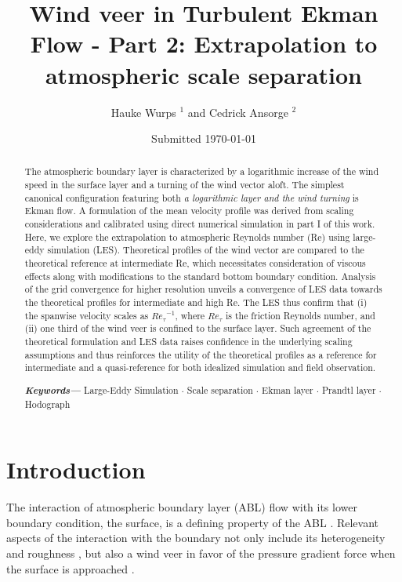 \documentclass[smallcondensed,draft]{svjour3}
\author{Hauke Wurps $^{1}$ and Cedrick Ansorge $^{2}$}
\institute{$^{1}$ Uni Oldenburg \newline 
$^{2}$ FU Berlin, Institut f\"ur Meteorologie, Carl-Heinrich-Becker-Weg 6--10, 12165 Berlin \email{cedrick@posteo.de}}
\date{Submitted \today}
\title{Wind veer in Turbulent Ekman Flow - Part 2: Extrapolation to atmospheric scale separation}
\providecommand{\keywords}[1]
{
  \small	
  \textbf{\textit{Keywords---}} #1
}
\begin{document}
 

\maketitle

\begin{abstract}
  The atmospheric boundary layer is characterized by a logarithmic increase of the wind speed in the surface layer and a turning of the wind vector aloft. The simplest canonical configuration featuring both \emph{a logarithmic layer and the wind turning} is Ekman flow. A formulation of the mean velocity profile was derived from scaling considerations and calibrated using direct numerical simulation in part I of this work. Here, we explore the extrapolation to atmospheric Reynolds number (Re) using large-eddy simulation (LES).
  Theoretical profiles of the wind vector are compared to the theoretical reference at intermediate Re, which necessitates consideration of viscous effects %
  along with modifications to the standard bottom boundary condition.
  Analysis of the grid convergence for higher resolution unveils a convergence of LES data towards the theoretical profiles for intermediate and high Re. The LES thus confirm that (i) the spanwise velocity scales as $\left.Re_\tau\right.^{-1}$, where $Re_\tau$ is the friction Reynolds number, and (ii) one third of the wind veer is confined to the surface layer.
  Such agreement of the theoretical formulation and LES data raises confidence in the underlying scaling assumptions and thus reinforces the utility of the theoretical profiles as a reference for intermediate and a quasi-reference for both idealized simulation and field observation.
%


\keywords{Large-Eddy Simulation $\cdot$ Scale separation $\cdot$ Ekman layer $\cdot$ Prandtl layer $\cdot$ Hodograph}
\end{abstract}
%
%
\section{Introduction}

The interaction of atmospheric boundary layer  (ABL) flow with its lower boundary condition, the surface, is a defining property of the ABL \citep{stull:1988}. Relevant aspects of the interaction with the boundary not only include its heterogeneity \citep{avissar:MWR1989,giorgi:RG1997,claussen:BM1991,garratt:BM1990} and roughness \citep{monin:ARF1970,brutsaert:WRR1975,raupach:AMR1991,kostelecky:JFM2024}, but also a wind veer in favor of the pressure gradient force when the surface is approached \citep{ekman:AMA1905}. 
\end{document}
